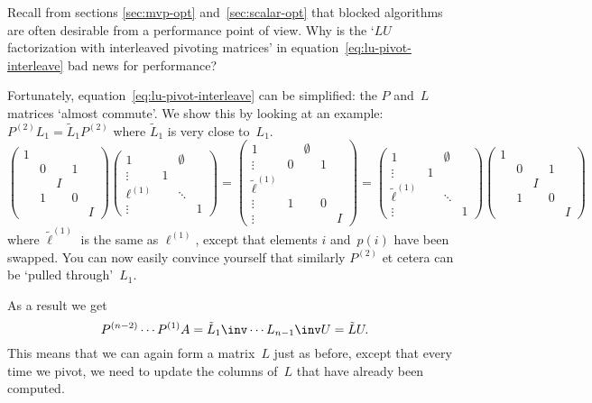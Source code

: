 \begin{exercise}
  Recall from sections \ref{sec:mvp-opt} and~\ref{sec:scalar-opt} that
  blocked algorithms are often desirable from a performance point of
  view. Why is the `$LU$ factorization with interleaved pivoting
  matrices' in equation~\eqref{eq:lu-pivot-interleave} bad news for
  performance?
\end{exercise}
Fortunately, equation~\eqref{eq:lu-pivot-interleave} can be
simplified: the $P$ and~$L$ matrices `almost commute'. We show this by
looking at an example: $P^{(2)}L_1=\tilde L_1P^{(2)}$ where $\tilde
L_1$ is very close to~$L_1$.
\[
\begin{pmatrix}
  1\\ &0&&1\\ &&I\\ &1&&0\\ &&&&I
\end{pmatrix}
\begin{pmatrix}
  1&&\emptyset\\ \vdots&1\\ \ell^{(1)}&&\ddots\\ \vdots&&&1
\end{pmatrix}
=
\begin{pmatrix}
  1&&\emptyset\\ \vdots&0&&1\\ \tilde\ell^{(1)}\\ 
  \vdots&1&&0\\ \vdots&&&&I
\end{pmatrix}
=
\begin{pmatrix}
  1&&\emptyset\\ \vdots&1\\ \tilde\ell^{(1)}&&\ddots\\ \vdots&&&1
\end{pmatrix}
\begin{pmatrix}
  1\\ &0&&1\\ &&I\\ &1&&0\\ &&&&I
\end{pmatrix}
\]
where $\tilde\ell^{(1)}$ is the same as $\ell^{(1)}$, except that
elements $i$ and~$p(i)$ have been swapped. You can now easily convince
yourself that similarly $P^{(2)}$ et cetera can be `pulled
through'~$L_1$. 

As a result we get
\begin{equation}
  \label{eq:lu-pivot}
  P^{(n-2)}\cdots P^{(1)}A
  =\tilde L_1\inv\cdots L_{n-1}\inv U=\tilde LU.
\end{equation}
This means that we can again form a matrix~$L$ just as before, except
that every time we pivot, we need to update the columns of~$L$ that
have already been computed.

